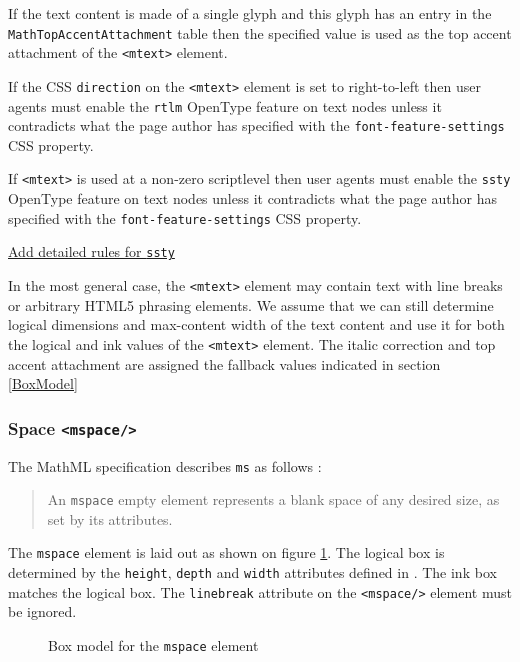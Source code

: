 If the text content is made of a single glyph and this glyph
has an entry in the {\tt MathTopAccentAttachment} table
then the specified value is used as the top accent attachment of the
{\tt <mtext>} element.

If the CSS {\tt direction} on the {\tt <mtext>} element is set to right-to-left
then user agents must enable the {\tt rtlm} OpenType feature on text nodes
unless it contradicts what the page author has specified with the
{\tt font-feature-settings} CSS property.

If {\tt <mtext>} is used at a non-zero scriptlevel then user agents must
enable the {\tt ssty} OpenType feature on text nodes unless it contradicts
what the page author has specified with the {\tt font-feature-settings}
CSS property.

\href{https://github.com/MathML/MathMLinHTML5/issues/2}{Add detailed rules for {\tt ssty}} 

In the most general case, the {\tt <mtext>} element may contain text with line
breaks or arbitrary HTML5 phrasing elements. We assume that we can still
determine logical dimensions
and max-content width of the text content and use it for both the logical and
ink values of the {\tt <mtext>} element. The italic correction and
top accent attachment are assigned the fallback values indicated in section
\ref{BoxModel}

\subsubsection{Space {\tt <mspace/>}}

The MathML specification describes {\tt ms} as follows \cite{MathML3}:
%
\begin{quote}
An {\tt mspace} empty element represents a blank space of any desired size, as
set by its attributes.
\end{quote}

The {\tt mspace} element is laid out as shown on figure
\ref{fig:MspaceBoxModel}.
The logical box is determined by the {\tt height}, {\tt depth} and {\tt width}
attributes defined in \cite{MathML3}. The ink box matches the logical box.
The {\tt linebreak} attribute on the {\tt <mspace/>} element must be ignored.

\begin{figure}
\centering
\caption{Box model for the {\tt mspace} element}
\label{fig:MspaceBoxModel}
\end{figure}

